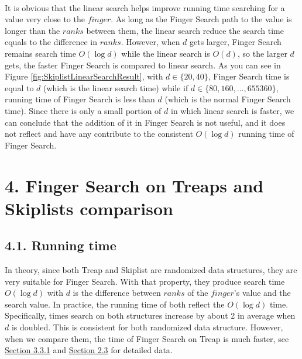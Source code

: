 \documentclass[12pt,english,]{article}
\begin{document}
~ ~ ~

\vspace{3mm}

It is obvious that the linear search helps improve running time
searching for a value very close to the \(finger\). As long as the
Finger Search path to the value is longer than the \(ranks\) between
them, the linear search reduce the search time equals to the difference
in \(ranks\). However, when \(d\) gets larger, Finger Search remains
search time \(O(\log d)\) while the linear search is \(O(d)\), so the
larger \(d\) gets, the faster Finger Search is compared to linear
search. As you can see in Figure \ref{fig:SkiplistLinearSearchResult},
with \(d \in \{20, 40\}\), Finger Search time is equal to \(d\) (which
is the linear search time) while if \(d\in\{80, 160,\ldots, 655360\}\),
running time of Finger Search is less than \(d\) (which is the normal
Finger Search time). Since there is only a small portion of \(d\) in
which linear search is faster, we can conclude that the addition of it
in Finger Search is not useful, and it does not reflect and have any
contribute to the consistent \(O(\log d)\) running time of Finger
Search.

\hypertarget{finger-search-on-treaps-and-skiplists-comparison}{%
\section{4. Finger Search on Treaps and Skiplists
comparison}\label{finger-search-on-treaps-and-skiplists-comparison}}

\hypertarget{running-time-1}{%
\subsection{4.1. Running time}\label{running-time-1}}

In theory, since both Treap and Skiplist are randomized data structures,
they are very suitable for Finger Search. With that property, they
produce search time \(O(\log d)\) with \(d\) is the difference between
\(ranks\) of the \(finger\)'s value and the search value. In practice,
the running time of both reflect the \(O(\log d)\) time. Specifically,
times search on both structures increase by about 2 in average when
\(d\) is doubled. This is consistent for both randomized data structure.
However, when we compare them, the time of Finger Search on Treap is
much faster, see \protect\hyperlink{section3.3.1}{Section 3.3.1} and
\protect\hyperlink{section2.3}{Section 2.3} for detailed data.
\end{document}
